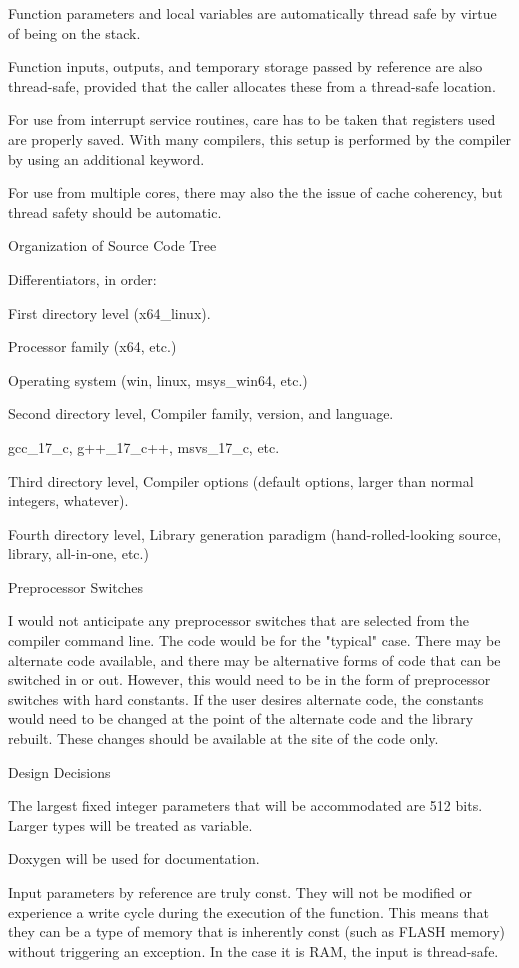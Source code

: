 Function parameters and local variables are automatically thread safe
by virtue of being on the stack.

Function inputs, outputs, and temporary storage passed by reference are
also thread-safe, provided that the caller allocates these from a
thread-safe location.

For use from interrupt service routines, care has to be taken that registers
used are properly saved. With many compilers, this setup is performed by
the compiler by using an additional keyword.

For use from multiple cores, there may also the the issue of cache
coherency, but thread safety should be automatic.

Organization of Source Code Tree

Differentiators, in order:

First directory level (x64\_linux).

Processor family (x64, etc.)

Operating system (win, linux, msys\_win64, etc.)

Second directory level, Compiler family, version, and language.

gcc\_17\_c, g++\_17\_c++, msvs\_17\_c, etc.

Third directory level, Compiler options (default options, larger than
normal integers, whatever).

Fourth directory level, Library generation paradigm (hand-rolled-looking
source, library, all-in-one, etc.)

Preprocessor Switches

I would not anticipate any preprocessor switches that are selected from the
compiler command line. The code would be for the "typical" case. There may
be alternate code available, and there may be alternative forms of code that
can be switched in or out. However, this would need to be in the form of
preprocessor switches with hard constants. If the user desires alternate code,
the constants would need to be changed at the point of the alternate code and
the library rebuilt. These changes should be available at the site of the
code only.

Design Decisions

The largest fixed integer parameters that will be accommodated are 512
bits. Larger types will be treated as variable.

Doxygen will be used for documentation.

Input parameters by reference are truly const. They will not be modified or
experience a write cycle during the execution of the function. This means
that they can be a type of memory that is inherently const (such as FLASH
memory) without triggering an exception. In the case it is RAM, the input
is thread-safe.


